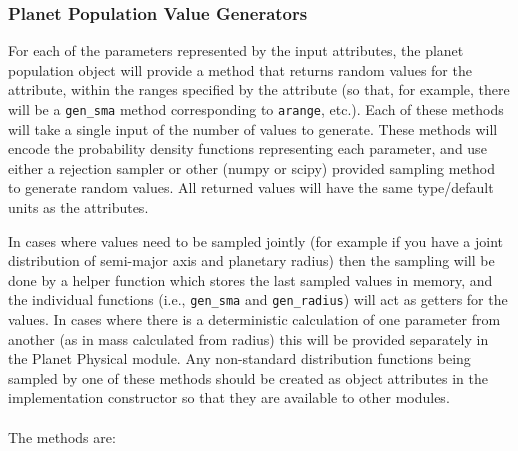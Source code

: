 \documentclass[cleanfoot]{asme2ej}
\begin{document}
\subsubsection{Planet Population Value Generators} \label{sec:pdfs}
For each of the parameters represented by the input attributes, the planet population object will provide a method that returns random values for the attribute, within the ranges specified by the attribute (so that, for example, there will be a \verb+gen_sma+ method corresponding to \verb+arange+, etc.).  Each of these methods will take a single input of the number of values to generate.  These methods will encode the probability density functions representing each parameter, and use either a rejection sampler or other (numpy or scipy) provided sampling method to generate random values.  All returned values will have the same type/default units as the attributes. 

In cases where values need to be sampled jointly (for example if you have a joint distribution of semi-major axis and planetary radius) then the sampling will be done by a helper function which stores the last sampled values in memory, and the individual functions (i.e., \verb+gen_sma+ and \verb+gen_radius+) will act as getters for the values.  In cases where there is a deterministic calculation of one parameter from another (as in mass calculated from radius) this will be provided separately in the Planet Physical module. Any non-standard distribution functions being sampled by one of these methods should be created as object attributes in the implementation constructor so that they are available to other modules.
\\\\
The methods are:
\end{document}
